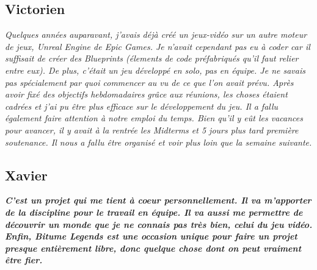 \documentclass[12pt,a4paper]{article}
\begin{document}
  \subsection{Victorien}
  \indent\textit{Quelques années auparavant, j’avais déjà créé un jeux-vidéo sur un autre moteur de jeux, \textit{Unreal Engine} de \textit{Epic Games}. 
  Je n’avait cependant pas eu à coder car il suffisait de créer des \textit{Blueprints} (élements de code préfabriqués qu’il faut relier entre eux).
  De plus, c’était un jeu développé en solo, pas en équipe. Je ne savais pas spécialement par quoi commencer au vu de ce que l’on avait prévu.
  Après avoir fixé des objectifs hebdomadaires grâce aux réunions, les choses étaient cadrées et j’ai pu être plus efficace sur le développement du jeu. 
  Il a fallu également faire attention à notre emploi du temps. 
  Bien qu’il y eût les vacances pour avancer, il y avait à la rentrée les Midterms et 5 jours plus tard première soutenance. 
  Il nous a fallu être organisé et voir plus loin que la semaine suivante. } %
  
  \subsection{Xavier}
  \indent\textit{\bfseries C'est un projet qui me tient à coeur personnellement. Il 
  va m'apporter de la discipline pour le travail en équipe. Il va aussi me 
  permettre de découvrir un monde que je ne connais pas très bien, celui du 
  jeu vidéo. Enfin, Bitume Legends est une occasion unique pour faire un projet 
  presque entièrement libre, donc quelque chose dont on peut vraiment être fier.}
\clearpage
\end{document}
